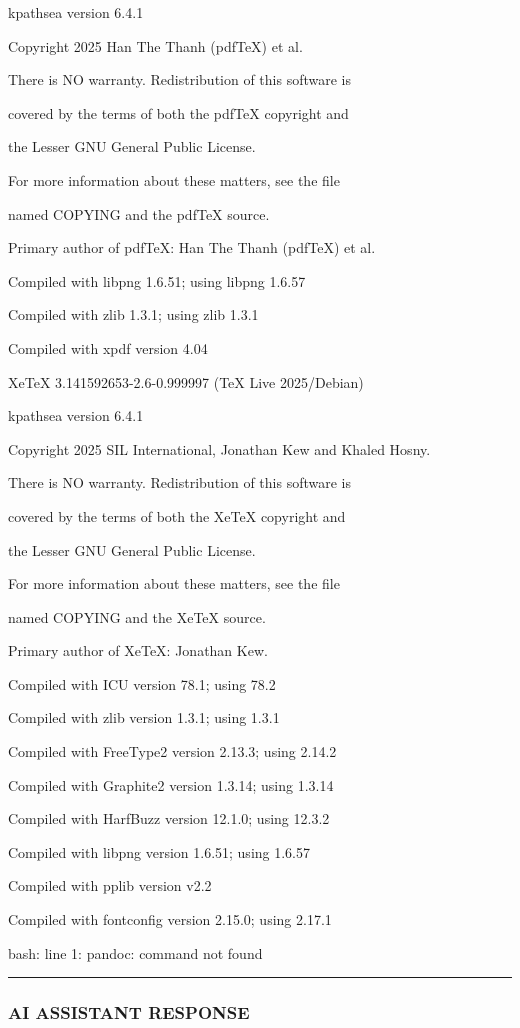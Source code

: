 \documentclass[11pt,a4paper]{article}
\begin{document}
{kpathsea version 6.4.1

Copyright 2025 Han The Thanh (pdfTeX) et al.

There is NO warranty.  Redistribution of this software is

covered by the terms of both the pdfTeX copyright and

the Lesser GNU General Public License.

For more information about these matters, see the file

named COPYING and the pdfTeX source.

Primary author of pdfTeX: Han The Thanh (pdfTeX) et al.

Compiled with libpng 1.6.51; using libpng 1.6.57

Compiled with zlib 1.3.1; using zlib 1.3.1

Compiled with xpdf version 4.04

XeTeX 3.141592653-2.6-0.999997 (TeX Live 2025/Debian)

kpathsea version 6.4.1

Copyright 2025 SIL International, Jonathan Kew and Khaled Hosny.

There is NO warranty.  Redistribution of this software is

covered by the terms of both the XeTeX copyright and

the Lesser GNU General Public License.

For more information about these matters, see the file

named COPYING and the XeTeX source.

Primary author of XeTeX: Jonathan Kew.

Compiled with ICU version 78.1; using 78.2

Compiled with zlib version 1.3.1; using 1.3.1

Compiled with FreeType2 version 2.13.3; using 2.14.2

Compiled with Graphite2 version 1.3.14; using 1.3.14

Compiled with HarfBuzz version 12.1.0; using 12.3.2

Compiled with libpng version 1.6.51; using 1.6.57

Compiled with pplib version v2.2

Compiled with fontconfig version 2.15.0; using 2.17.1

bash: line 1: pandoc: command not found


\hrule

\subsubsection{AI ASSISTANT RESPONSE}

}
\end{document}
